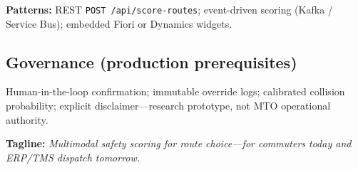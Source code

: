 \documentclass[11pt,a4paper]{article}
\begin{document}
\noindent\textbf{Patterns:} REST \texttt{POST /api/score-routes}; event-driven scoring (Kafka / Service Bus); embedded Fiori or Dynamics widgets.

\subsection*{Governance (production prerequisites)}
Human-in-the-loop confirmation; immutable override logs; calibrated collision probability; explicit disclaimer---research prototype, not MTO operational authority.

\vspace{0.5em}
\noindent\textbf{Tagline:} \emph{Multimodal safety scoring for route choice---for commuters today and ERP/TMS dispatch tomorrow.}
\end{document}
